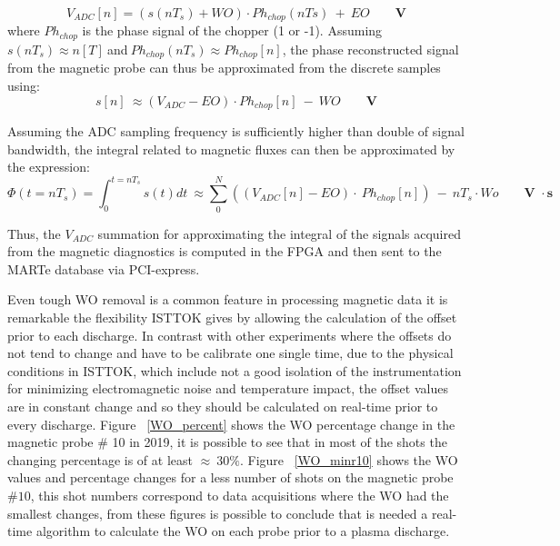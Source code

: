 \begin{equation}
V_{ADC}[n]=(s(nT_s)+WO)\cdot Ph_{chop}(nTs)~+~EO \qquad \textbf{V}
\end{equation}
where $Ph_{chop}$ is the phase signal of the chopper (1 or -1). Assuming $s(nT_s)\approx n[T]~$and$~Ph_{chop}(nT_s)\approx Ph_{chop}[n] $, the phase reconstructed signal from the magnetic probe can thus be approximated from the discrete samples using:
\begin{equation}
s[n]~\approx (V_{ADC}-EO) \cdot Ph_{chop}[n]~-~WO\qquad \textbf{V}
\end{equation}

Assuming the ADC sampling frequency is sufficiently higher than double of signal bandwidth, the integral related to magnetic fluxes can then be approximated by the expression:
\smallskip
 \begin{equation}
 	\Phi (t=nT_s)=\int_{0}^{t=nT_s} s(t)dt~\approx \sum_{0}^{N} ((V_{ADC}[n]-EO)\cdot ~ Ph_{chop}[n])~-~nT_s\cdot Wo\qquad \textbf{V } \cdot \textbf{s}
 \end{equation}

Thus, the $V_{ADC}$ summation for approximating the integral of the signals acquired from the magnetic diagnostics is computed  in the FPGA and then sent to the MARTe database via PCI-express.\smallskip
 

Even tough  WO removal is a common feature in processing magnetic data it is remarkable the flexibility ISTTOK gives by allowing the calculation of the offset prior to each discharge. In contrast with other experiments where the offsets do not tend to change and have to be calibrate one single time, due to the physical conditions in ISTTOK, which include not a good isolation of the instrumentation for minimizing electromagnetic noise and temperature impact, the offset values are in constant change and so they should be calculated on real-time prior to  every discharge. Figure  ~\ref{WO_percent} shows the WO percentage change in the magnetic probe $\#$ 10  in 2019, it is possible to see that in most of the shots the changing percentage is of at least $\approx~30\%$. Figure   ~\ref{WO_minr10} shows the WO values and percentage changes for a less number of shots on the magnetic probe $\#10$, this shot numbers correspond to data acquisitions where the WO had the smallest changes, from these figures is possible to conclude that is needed a real-time algorithm to calculate the WO on each probe prior to a plasma discharge. \smallskip

